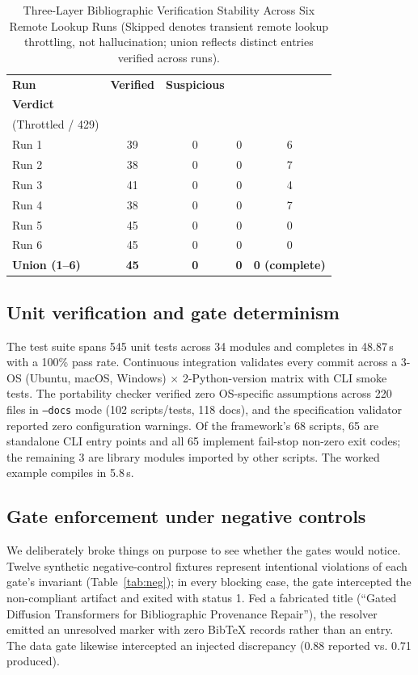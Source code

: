 \documentclass[conference]{IEEEtran}
\begin{document}
\begin{table}[t]
\centering
\caption{Three-Layer Bibliographic Verification Stability Across Six Remote Lookup Runs (Skipped denotes transient remote lookup throttling, not hallucination; union reflects distinct entries verified across runs).}
\label{tab:verify}
\renewcommand{\arraystretch}{0.88}
\setlength{\tabcolsep}{3.2pt}
\scriptsize
\begin{tabular}{@{}lcccc@{}}
\toprule
\textbf{Run} & \textbf{Verified} & \textbf{Suspicious} & \shortstack{\textbf{Hallucination}\\\scriptsize\textbf{Verdict}} & \shortstack{\textbf{Skipped}\\\scriptsize(Throttled / 429)} \\
\midrule
\rowcolor{rowtint} Run 1 & 39 & 0 & 0 & 6 \\
Run 2 & 38 & 0 & 0 & 7 \\
\rowcolor{rowtint} Run 3 & 41 & 0 & 0 & 4 \\
Run 4 & 38 & 0 & 0 & 7 \\
\rowcolor{rowtint} Run 5 & 45 & 0 & 0 & 0 \\
Run 6 & 45 & 0 & 0 & 0 \\
\midrule
\rowcolor{gateblue!12} \textbf{Union (1--6)} & \textbf{45} & \textbf{0} & \textbf{0} & \textbf{0 (complete)} \\
\bottomrule
\end{tabular}
\end{table}

\subsection{Unit verification and gate determinism}
The test suite spans 545 unit tests across 34 modules and completes in 48.87\,s with a 100\% pass rate. Continuous integration validates every commit across a 3-OS (Ubuntu, macOS, Windows) $\times$ 2-Python-version matrix with CLI smoke tests. The portability checker verified zero OS-specific assumptions across 220 files in \texttt{--docs} mode (102 scripts/tests, 118 docs), and the specification validator reported zero configuration warnings. Of the framework's 68 scripts, 65 are standalone CLI entry points and all 65 implement fail-stop non-zero exit codes; the remaining 3 are library modules imported by other scripts. The worked example compiles in 5.8\,s.

\subsection{Gate enforcement under negative controls}
We deliberately broke things on purpose to see whether the gates would notice. Twelve synthetic negative-control fixtures represent intentional violations of each gate's invariant (Table~\ref{tab:neg}); in every blocking case, the gate intercepted the non-compliant artifact and exited with status 1. Fed a fabricated title (``Gated Diffusion Transformers for Bibliographic Provenance Repair''), the resolver emitted an unresolved marker with zero BibTeX records rather than an entry. The data gate likewise intercepted an injected discrepancy (0.88 reported vs. 0.71 produced).
\end{document}
